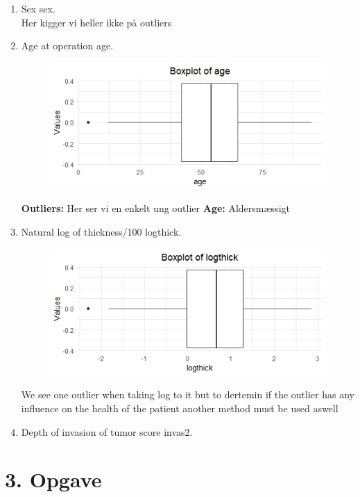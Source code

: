 \begin{enumerate}
\item Sex sex.\\
Her kigger vi heller ikke på outliers
\item Age at operation age.\\
\begin{figure}
    \centering
    \includegraphics[width=0.5\linewidth]{Project/BIlleder_Duration/Age_Outliers.jpeg}
\end{figure}
\textbf{Outliers: }Her ser vi en enkelt ung outlier 
\textbf{Age: } Aldersmæssigt 
\item Natural log of thickness/100 logthick.\\
\begin{figure}
    \centering
    \includegraphics[width=0.5\linewidth]{Project/BIlleder_Duration/logthickness_Outlier.jpeg}
\end{figure}
We see one outlier when taking log to it but to dertemin if the outlier has any influence on the health of the patient another method must be used aswell
\item Depth of invasion of tumor score invas2.
\end{enumerate}



\chapter{3. Opgave}
